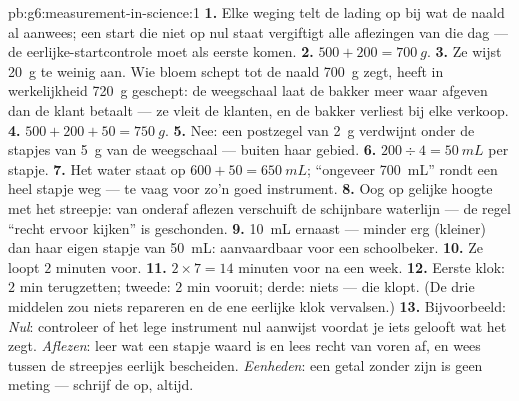 \begin{solution}{pb:g6:measurement-in-science:1}
\textbf{1.} Elke weging telt de lading op bij wat de naald al
aanwees; een start die niet op nul staat vergiftigt alle aflezingen
van die dag --- de eerlijke-startcontrole moet als eerste komen.
\textbf{2.} $500 + 200 = \qty{700}{g}$.
\textbf{3.} Ze wijst \qty{20}{g} te weinig aan. Wie bloem schept tot
de naald \qty{700}{g} zegt, heeft in werkelijkheid \qty{720}{g}
geschept: de weegschaal laat de bakker meer waar afgeven dan de klant
betaalt --- ze vleit de klanten, en de bakker verliest bij elke
verkoop.
\textbf{4.} $500 + 200 + 50 = \qty{750}{g}$.
\textbf{5.} Nee: een postzegel van \qty{2}{g} verdwijnt onder de
stapjes van \qty{5}{g} van de weegschaal --- buiten haar gebied.
\textbf{6.} $200 \div 4 = \qty{50}{mL}$ per stapje.
\textbf{7.} Het water staat op $600 + 50 = \qty{650}{mL}$; ``ongeveer
\qty{700}{mL}'' rondt een heel stapje weg --- te vaag voor zo'n goed
instrument.
\textbf{8.} Oog op gelijke hoogte met het streepje: van onderaf
aflezen verschuift de schijnbare waterlijn --- de regel ``recht ervoor
kijken'' is geschonden.
\textbf{9.} \qty{10}{mL} ernaast --- minder erg (kleiner) dan haar
eigen stapje van \qty{50}{mL}: aanvaardbaar voor een schoolbeker.
\textbf{10.} Ze loopt $2$ minuten voor.
\textbf{11.} $2 \times 7 = 14$ minuten voor na een week.
\textbf{12.} Eerste klok: $2$ min terugzetten; tweede: $2$ min
vooruit; derde: niets --- die klopt. (De drie middelen zou niets
repareren en de ene eerlijke klok vervalsen.)
\textbf{13.} Bijvoorbeeld: \emph{Nul}: controleer of het lege
instrument nul aanwijst voordat je iets gelooft wat het zegt.
\emph{Aflezen}: leer wat een stapje waard is en lees recht van voren
af, en wees tussen de streepjes eerlijk bescheiden.
\emph{Eenheden}: een getal zonder zijn  is geen meting ---
schrijf de  op, altijd.
\end{solution}
